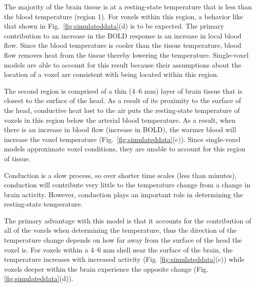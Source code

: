     The majority of the brain tissue is at a resting-state temperature that is less than the blood temperature (region 1).  For voxels within this region, a behavior like that shown in Fig.~\ref{fig:simulateddata}(d) is to be expected.  The primary contribution to an increase in the BOLD response is an increase in local blood flow.  Since the blood temperature is cooler than the tissue temperature, blood flow removes heat from the tissue thereby lowering the temperature.  Single-voxel models are able to account for this result because their assumptions about the location of a voxel are consistent with being located within this region.
    
    The second region is comprised of a thin (4--6 mm) layer of brain tissue that is closest to the surface of the head.  As a result of its proximity to the surface of the head, conductive heat lost to the air puts the resting-state temperature of voxels in this region below the arterial blood temperature.  As a result, when there is an increase in blood flow (increase in BOLD), the warmer blood will increase the voxel temperature (Fig.~\ref{fig:simulateddata}(c)).  Since single-voxel models approximate voxel conditions, they are unable to account for this region of tissue.
    
    Conduction is a slow process, so over shorter time scales (less than  minutes), conduction will contribute very little to the temperature change from a change in brain activity.  However, conduction plays an important role in determining the resting-state temperature.  
    
    The primary advantage with this model is that it accounts for the contribution of all of the voxels when determining the temperature, thus the direction of the temperature change depends on how far away from the surface of the head the voxel is. For voxels within a 4--6 mm shell near the surface of the brain, the temperature increases with increased activity (Fig. \ref{fig:simulateddata}(c)) while voxels deeper within the brain experience the opposite change (Fig. \ref{fig:simulateddata}(d)).
    
